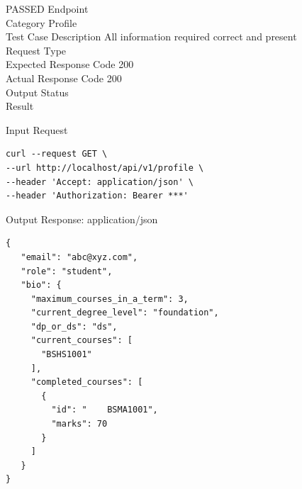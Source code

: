 \begin{testcase}{2}{PASSED}
Endpoint \hfill {}\\
Category \hfill Profile\\
Test Case Description \hfill All information required correct and present\\

Request Type    \hfill {}\\
Expected Response Code    \hfill 200\\
Actual Response Code    \hfill 200\\

Output Status \hfill {}\\
Result \hfill {}

\begin{ipblock}{Input Request}
\begin{verbatim}
curl --request GET \
--url http://localhost/api/v1/profile \
--header 'Accept: application/json' \
--header 'Authorization: Bearer ***'
\end{verbatim}
\end{ipblock}

\begin{opblock}{Output Response: application/json}
\begin{verbatim}
{
   "email": "abc@xyz.com",
   "role": "student",
   "bio": {
     "maximum_courses_in_a_term": 3,
     "current_degree_level": "foundation",
     "dp_or_ds": "ds",
     "current_courses": [
       "BSHS1001"
     ],
     "completed_courses": [
       {
         "id": "	BSMA1001",
         "marks": 70
       }
     ]
   }
}
\end{verbatim}
\end{opblock}
\end{testcase}


